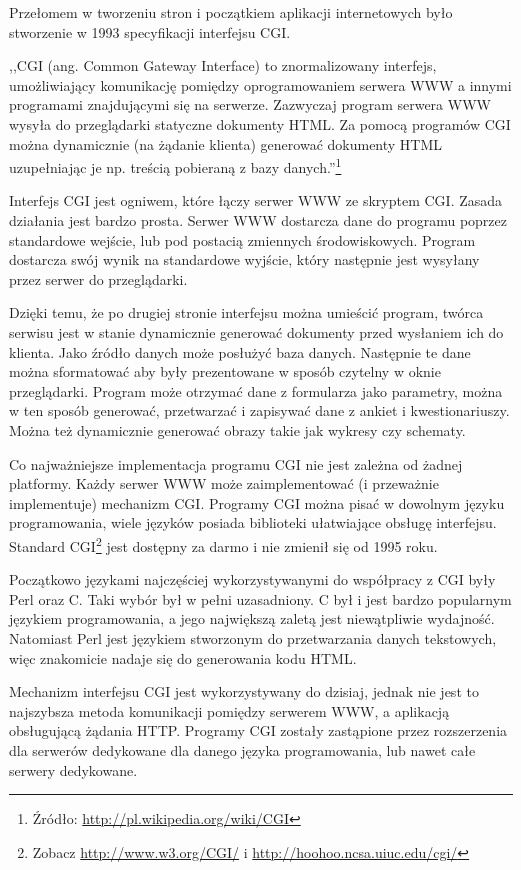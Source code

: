 \documentclass[a4paper,12pt,oneside]{report}
\begin{document}
Przełomem w tworzeniu stron i początkiem aplikacji internetowych było stworzenie w 1993 specyfikacji interfejsu CGI.

,,CGI (ang. Common Gateway Interface) to znormalizowany interfejs, umożliwiający komunikację pomiędzy oprogramowaniem serwera WWW a innymi programami znajdującymi się na serwerze. Zazwyczaj program serwera WWW wysyła do przeglądarki statyczne dokumenty HTML. Za pomocą programów CGI można dynamicznie (na żądanie klienta) generować dokumenty HTML uzupełniając je np. treścią pobieraną z bazy danych.''\footnote{Źródło: \url{http://pl.wikipedia.org/wiki/CGI}}

Interfejs CGI jest ogniwem, które łączy serwer WWW ze skryptem CGI. Zasada działania jest bardzo prosta. Serwer WWW dostarcza dane do programu poprzez standardowe wejście, lub pod postacią zmiennych środowiskowych. Program dostarcza swój wynik na standardowe wyjście, który następnie jest wysyłany przez serwer do przeglądarki. 

Dzięki temu, że po drugiej stronie interfejsu można umieścić program, twórca serwisu jest w stanie dynamicznie generować dokumenty przed wysłaniem ich do klienta. Jako źródło danych może posłużyć baza danych. Następnie te dane można sformatować aby były prezentowane w sposób czytelny w oknie przeglądarki. Program może otrzymać dane z formularza jako parametry, można w ten sposób generować, przetwarzać i zapisywać dane z ankiet i kwestionariuszy. Można też dynamicznie generować obrazy takie jak wykresy czy schematy.

Co najważniejsze implementacja programu CGI nie jest zależna od żadnej platformy. Każdy serwer WWW może zaimplementować (i przeważnie implementuje) mechanizm CGI. Programy CGI można pisać w dowolnym języku programowania, wiele języków posiada biblioteki ułatwiające obsługę interfejsu. Standard CGI\footnote{Zobacz \url{http://www.w3.org/CGI/} i \url{http://hoohoo.ncsa.uiuc.edu/cgi/}} jest dostępny za darmo i nie zmienił się od 1995 roku. 

Początkowo językami najczęściej wykorzystywanymi do współpracy z CGI były Perl oraz C. Taki wybór był w pełni uzasadniony. C był i jest bardzo popularnym językiem programowania, a jego największą zaletą jest niewątpliwie wydajność. Natomiast Perl jest językiem stworzonym do przetwarzania danych tekstowych, więc znakomicie nadaje się do generowania kodu HTML.

Mechanizm interfejsu CGI jest wykorzystywany do dzisiaj, jednak nie jest to najszybsza metoda komunikacji pomiędzy serwerem WWW, a aplikacją obsługującą żądania HTTP. Programy CGI zostały zastąpione przez rozszerzenia dla serwerów dedykowane dla danego języka programowania, lub nawet całe serwery dedykowane.
\end{document}
